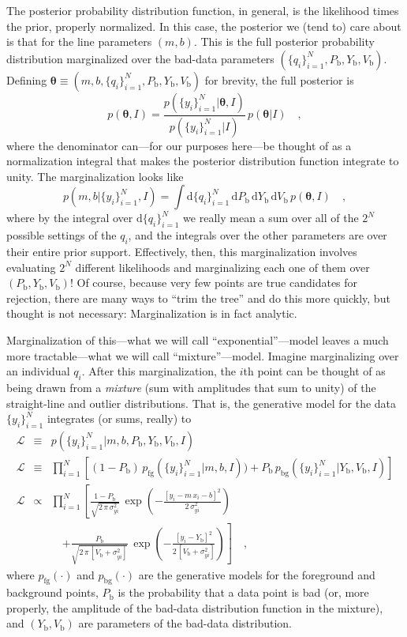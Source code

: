 \documentclass[12pt,twoside,pdftex]{article}
\newcommand{\mmatrix}[1]{\boldsymbol{#1}}
\newcommand{\parametervector}[1]{\mmatrix{#1}}
\newcommand{\pvtheta}{\parametervector{\theta}}
\newcommand{\setofall}[3]{\{{#1}\}_{{#2}}^{{#3}}}
\newcommand{\allq}{\setofall{q_i}{i=1}{N}}
\newcommand{\ally}{\setofall{y_i}{i=1}{N}}
\renewcommand{\d}{\mathrm{d}}
\newcommand{\like}{\mathscr{L}}
\newcommand{\pfg}{p_{\mathrm{fg}}}
\newcommand{\pbg}{p_{\mathrm{bg}}}
\newcommand{\Pbad}{P_{\mathrm{b}}}
\newcommand{\Ybad}{Y_{\mathrm{b}}}
\newcommand{\Vbad}{V_{\mathrm{b}}}
\begin{document}
The posterior probability distribution function, in general, is the
likelihood times the prior, properly normalized.  In this case, the
posterior we (tend to) care about is that for the line parameters
$(m,b)$.  This is the full posterior probability distribution
marginalized over the bad-data parameters $(\allq,\Pbad,\Ybad,\Vbad)$.
Defining $\pvtheta\equiv(m,b,\allq,\Pbad,\Ybad,\Vbad)$ for brevity, the
full posterior is
\begin{equation}
p(\pvtheta,I) =
 \frac{p(\ally|\pvtheta,I)}{p(\ally|I)}
 \,p(\pvtheta|I)
 \quad,
\end{equation}
where the denominator can---for our purposes here---be thought of as a
normalization integral that makes the posterior distribution function
integrate to unity.  The marginalization looks like
\begin{equation}
p(m,b|\ally,I)=\int \d\allq\,\d\Pbad\,\d\Ybad\,\d\Vbad
 \,p(\pvtheta,I) \quad,
\end{equation}
where by the integral over $\d\allq$ we really mean a sum over all of
the $2^N$ possible settings of the $q_i$, and the integrals over the
other parameters are over their entire prior support.  Effectively,
then, this marginalization involves evaluating $2^N$ different
likelihoods and marginalizing each one of them over
$(\Pbad,\Ybad,\Vbad)$!  Of course, because very few points are true
candidates for rejection, there are many ways to ``trim the tree'' and
do this more quickly, but thought is not necessary: Marginalization is
in fact analytic.

Marginalization of this---what we will call ``exponential''---model
leaves a much more tractable---what we will call ``mixture''---model.
Imagine marginalizing over an individual $q_i$.  After this
marginalization, the $i$th point can be thought of as being drawn from
a \emph{mixture} (sum with amplitudes that sum to unity) of the
straight-line and outlier distributions.  That is, the generative
model for the data $\ally$ integrates (or sums, really) to
\begin{eqnarray}\label{eq:mixture}\displaystyle
\like &\equiv& p(\ally|m,b,\Pbad,\Ybad,\Vbad,I)
 \nonumber\\
\like &\equiv& \prod_{i=1}^N
 \left[ (1-\Pbad)\,\pfg(\ally|m,b,I))
 + \Pbad\,\pbg(\ally|\Ybad,\Vbad,I) \right]
 \nonumber\\
\like &\propto&
 \prod_{i=1}^N \left[\frac{1-\Pbad}{\sqrt{2\,\pi\,\sigma_{yi}^2}}
 \,\exp\left(-\frac{[y_i-m\,x_i-b]^2}{2\,\sigma_{yi}^2}\right)\right.
 \nonumber \\ & & \quad
 \left.+ \frac{\Pbad}{\sqrt{2\,\pi\,[\Vbad+\sigma_{yi}^2]}}
 \,\exp\left(-\frac{[y_i-\Ybad]^2}{2\,[\Vbad+\sigma_{yi}^2]}\right)\right]
 \quad ,
\end{eqnarray}
where $\pfg(\cdot)$ and $\pbg(\cdot)$ are the generative models for
the foreground and background points, $\Pbad$ is the probability that
a data point is bad (or, more properly, the amplitude of the bad-data
distribution function in the mixture), and $(\Ybad,\Vbad)$ are
parameters of the bad-data distribution.
\end{document}
